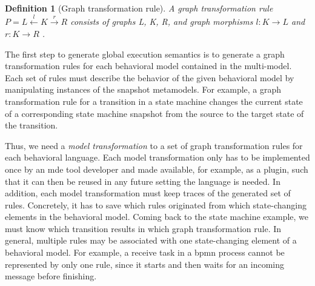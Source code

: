 \documentclass{jot}
\newtheorem{definition}{Definition}
\begin{document}
\begin{definition}[Graph transformation rule] \label{def:gtRule}
A graph transformation rule $P= L \overset{l}{\leftarrow} K \overset{r}{\to} R$ consists of graphs L, K, R, and graph morphisms $l: K \to L$ and $r: K \to R$ \cite{ehrigFundamentalsAlgebraicGraph2006}. 
\end{definition}

The first step to generate global execution semantics is to generate a graph transformation rules for each behavioral model contained in the multi-model. %
Each set of rules must describe the behavior of the given behavioral model by manipulating instances of the snapshot metamodels.
For example, a graph transformation rule for a transition in a state machine changes the current state of a corresponding state machine snapshot from the source to the target state of the transition. 

Thus, we need a \emph{model transformation} to a set of graph transformation rules for each behavioral language.
Each model transformation only has to be implemented once by an \gls*{mde} tool developer and made available, for example, as a plugin, such that it can then be reused in any future setting the language is needed.
In addition, each model transformation must keep traces of the generated set of rules.
Concretely, it has to save which rules originated from which state-changing elements in the behavioral model.
Coming back to the state machine example, we must know which transition results in which graph transformation rule.
In general, multiple rules may be associated with one state-changing element of a behavioral model.
For example, a receive task in a \gls*{bpmn} process cannot be represented by only one rule, since it starts and then waits for an incoming message before finishing.
\end{document}
